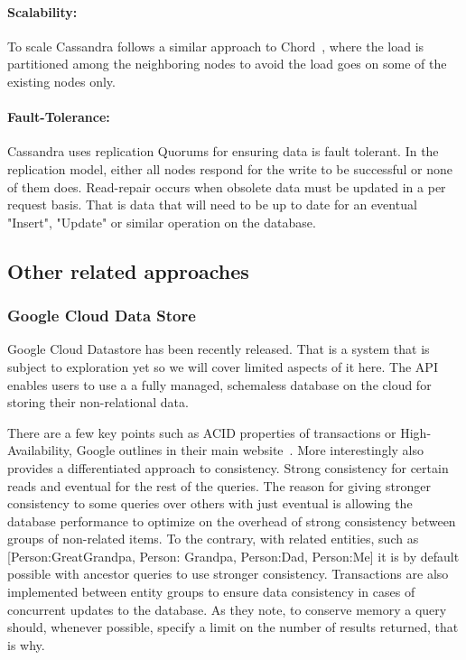 \paragraph{Scalability:}
To scale Cassandra follows a similar approach to Chord~\cite{Stoica:2001}, where the load is partitioned among the neighboring nodes to avoid the load goes on some of the existing nodes only.

\paragraph{Fault-Tolerance:}
Cassandra uses replication Quorums for ensuring data is fault tolerant. In the replication model, either all nodes respond for the write to be successful or none of them does. Read-repair occurs when obsolete data must be updated in a per request basis. That is data that will need to be up to date for an eventual "Insert", "Update" or similar operation on the database.

%



\subsection{Other related approaches}
\subsubsection{Google Cloud Data Store}
Google Cloud Datastore has been recently released. That is a system that is subject to exploration yet so we will cover limited aspects of it here. The API enables users to use a a fully managed, schemaless database on the cloud for storing their non-relational data.

There are a few key points such as ACID properties of transactions or High-Availability, Google outlines in their main website~\cite{GoogleCloudDataStore}. More interestingly also provides a differentiated approach to consistency. Strong consistency for certain reads and eventual for the rest of the queries. The reason for giving stronger consistency to some queries over others with just eventual is allowing the database performance to optimize on the overhead of strong consistency between groups of non-related items. To the contrary, with related entities, such as [Person:GreatGrandpa, Person: Grandpa, Person:Dad, Person:Me] it is by default possible with ancestor queries to use stronger consistency. Transactions are also implemented between entity groups to ensure data consistency in cases of concurrent updates to the database. As they note, to conserve memory a query should, whenever possible, specify a limit on the number of results returned, that is why.

